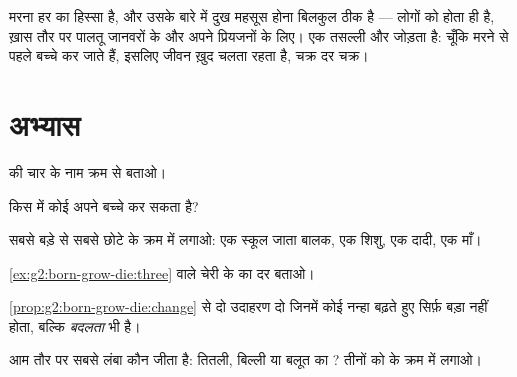 \begin{remark}[मृत्यु की बात]\label{rem:g2:born-grow-die:death}
मरना हर  का हिस्सा है, और उसके बारे में दुख महसूस होना
बिलकुल ठीक है --- लोगों को होता ही है, ख़ास तौर पर पालतू जानवरों के
और अपने प्रियजनों के लिए।  एक तसल्ली और जोड़ता है: चूँकि
 मरने से पहले बच्चे कर जाते हैं, इसलिए जीवन ख़ुद चलता रहता है,
चक्र दर चक्र।
\end{remark}

\section{अभ्यास}

\begin{exercise}[$\star$]\label{exo:g2:born-grow-die:1}
 की चार  के नाम क्रम से बताओ।
\end{exercise}

\begin{exercise}[$\star$]\label{exo:g2:born-grow-die:2}
किस  में कोई  अपने बच्चे कर सकता है?
\end{exercise}

\begin{exercise}[$\star$]\label{exo:g2:born-grow-die:3}
सबसे बड़े से सबसे छोटे के क्रम में लगाओ: एक स्कूल जाता बालक, एक शिशु,
एक दादी, एक माँ।
\end{exercise}

\begin{exercise}[$\star$]\label{exo:g2:born-grow-die:4}
\cref{ex:g2:born-grow-die:three} वाले चेरी के  का 
 दर  बताओ।
\end{exercise}

\begin{exercise}[$\star$]\label{exo:g2:born-grow-die:5}
\cref{prop:g2:born-grow-die:change} से दो उदाहरण दो जिनमें कोई नन्हा
 बढ़ते हुए सिर्फ़ बड़ा नहीं होता, बल्कि \emph{बदलता} भी है।
\end{exercise}

\begin{exercise}[$\star$]\label{exo:g2:born-grow-die:6}
आम तौर पर सबसे लंबा कौन जीता है: तितली, बिल्ली या बलूत का ?
तीनों को  के क्रम में लगाओ।
\end{exercise}

